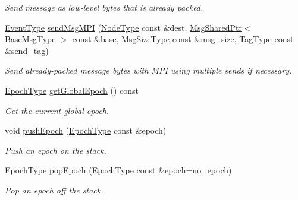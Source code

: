 \begin{DoxyCompactItemize}
\begin{DoxyCompactList}\small\item\em Send message as low-\/level bytes that is already packed. \end{DoxyCompactList}\item 
\hyperlink{namespacevt_a009267401def7ae8bf201892222d060f}{Event\+Type} \hyperlink{structvt_1_1messaging_1_1_active_messenger_ad1406c7f73624f030a0d74dd210ca9d6}{send\+Msg\+M\+PI} (\hyperlink{namespacevt_a866da9d0efc19c0a1ce79e9e492f47e2}{Node\+Type} const \&dest, \hyperlink{structvt_1_1messaging_1_1_msg_shared_ptr}{Msg\+Shared\+Ptr}$<$ \hyperlink{namespacevt_a44d0d4e144748f2b19a1cfd962f50338}{Base\+Msg\+Type} $>$ const \&base, \hyperlink{namespacevt_a408e86a8c7c89309b52907dc5a513924}{Msg\+Size\+Type} const \&msg\+\_\+size, \hyperlink{namespacevt_a84ab281dae04a52a4b243d6bf62d0e52}{Tag\+Type} const \&send\+\_\+tag)
\begin{DoxyCompactList}\small\item\em Send already-\/packed message bytes with M\+PI using multiple sends if necessary. \end{DoxyCompactList}\item 
\hyperlink{namespacevt_a81d11b28122d43bf9834577e4a06440f}{Epoch\+Type} \hyperlink{structvt_1_1messaging_1_1_active_messenger_abb892a84a906954d8769794ccfb0c638}{get\+Global\+Epoch} () const
\begin{DoxyCompactList}\small\item\em Get the current global epoch. \end{DoxyCompactList}\item 
void \hyperlink{structvt_1_1messaging_1_1_active_messenger_ac60a61b85392a5c40d2334919981963a}{push\+Epoch} (\hyperlink{namespacevt_a81d11b28122d43bf9834577e4a06440f}{Epoch\+Type} const \&epoch)
\begin{DoxyCompactList}\small\item\em Push an epoch on the stack. \end{DoxyCompactList}\item 
\hyperlink{namespacevt_a81d11b28122d43bf9834577e4a06440f}{Epoch\+Type} \hyperlink{structvt_1_1messaging_1_1_active_messenger_a0ff3c2d9bf6ccd66002679b93821229c}{pop\+Epoch} (\hyperlink{namespacevt_a81d11b28122d43bf9834577e4a06440f}{Epoch\+Type} const \&epoch=no\+\_\+epoch)
\begin{DoxyCompactList}\small\item\em Pop an epoch off the stack. \end{DoxyCompactList}\item 

\end{DoxyCompactItemize}
